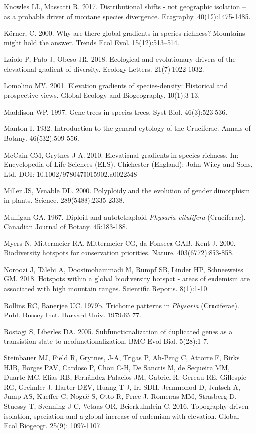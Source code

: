 Knowles LL, Massatti R. 2017. Distributional shifts - not geographic isolation – as a probable driver of montane species divergence. Ecography. 40(12):1475-1485.

Körner, C. 2000. Why are there global gradients in species richness? Mountains might hold the answer. Trends Ecol Evol. 15(12):513–514.

Laiolo P, Pato J, Obeso JR. 2018. Ecological and evolutionary drivers of the elevational gradient of diversity. Ecology Letters. 21(7):1022-1032.

Lomolino MV. 2001. Elevation gradients of species-density: Historical and prospective views. Global Ecology and Biogeography. 10(1):3-13.

Maddison WP. 1997. Gene trees in species trees. Syst Biol. 46(3):523-536.

Manton I. 1932. Introduction to the general cytology of the Cruciferae. Annals of Botany. 46(532):509-556.

McCain CM, Grytnes J-A. 2010. Elevational gradients in species richness. In: Encyclopedia of Life Sciences (ELS). Chichester (England): John Wiley and Sons, Ltd.  DOI: 10.1002/9780470015902.a0022548

Miller JS, Venable DL. 2000. Polyploidy and the evolution of gender dimorphism in plants. Science. 289(5488):2335-2338.

Mulligan GA. 1967. Diploid and autotetraploid \textit{Physaria vitulifera} (Cruciferae). Canadian Journal of Botany. 45:183-188.

Myers N, Mittermeier RA, Mittermeier CG, da Fonseca GAB, Kent J. 2000. Biodiversity hotspots for conservation priorities. Nature. 403(6772):853-858.

Noroozi J, Talebi A, Doostmohammadi M, Rumpf SB, Linder HP, Schneeweiss GM. 2018. Hotspots within a global biodiversity hotspot - areas of endemism are associated with high mountain ranges. Scientific Reports. 8(1):1-10.

Rollins RC, Banerjee UC. 1979b. Trichome patterns in \textit{Physaria} (Cruciferae). Publ. Bussey Inst. Harvard Univ. 1979:65-77.

Rostagi S, Liberles DA. 2005. Subfunctionalization of duplicated genes as a transistion state to neofunctionalization. BMC Evol Biol. 5(28):1-7.

Steinbauer MJ, Field R, Grytnes, J-A, Trigas P, Ah-Peng C, Attorre F, Birks HJB, Borges PAV, Cardoso P, Chou C-H, De Sanctis M, de Sequeira MM,  Duarte MC, Elias RB, Fern\v{a}ndez-Palacios JM, Gabriel R, Gereau RE, Gillespie RG, Greimler J, Harter DEV, Huang T-J, Irl SDH, Jeanmonod D, Jentsch A, Jump AS, Kueffer C, Nogu\v{e} S, Otto R, Price J, Romeiras MM, Strasberg D, Stuessy T, Svenning J-C, Vetaas OR, Beierkuhnlein C. 2016. Topography-driven isolation, speciation and a global increase of endemism with elevation. Global Ecol Biogeogr. 25(9): 1097-1107.

